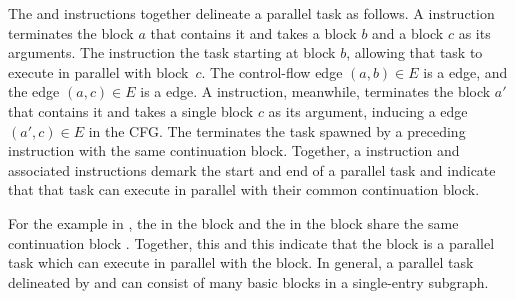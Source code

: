 
The \detach and \reattach instructions together delineate a parallel
task as follows.  A \detach instruction terminates the block $a$ that
contains it and takes a  block $b$ and a
 block $c$ as its arguments.  The \detach
instruction  the task starting at block $b$, allowing
that task to execute in parallel with block~$c$.  The control-flow
edge $(a,b)\in E$ is a  edge, and the edge $(a,c)\in E$
is a  edge.  A \reattach instruction, meanwhile,
terminates the block $a'$ that contains it and takes a single
 block $c$ as its argument, inducing a
 edge $(a',c)\in E$ in the CFG\@.  The \reattach
terminates the task spawned by a preceding \detach instruction with
the same continuation block.  Together, a \detach instruction and
associated \reattach instructions demark the start and end of a
parallel task and indicate that that task can execute in parallel with
their common continuation block.

For the example in , the \detach in the
 block and the \reattach in the  block share
the same continuation block .  Together, this \detach and
this \reattach indicate that the  block is a parallel task
which can execute in parallel with the  block.  In general,
a parallel task delineated by \detach and \reattach can consist of
many basic blocks in a single-entry subgraph.




